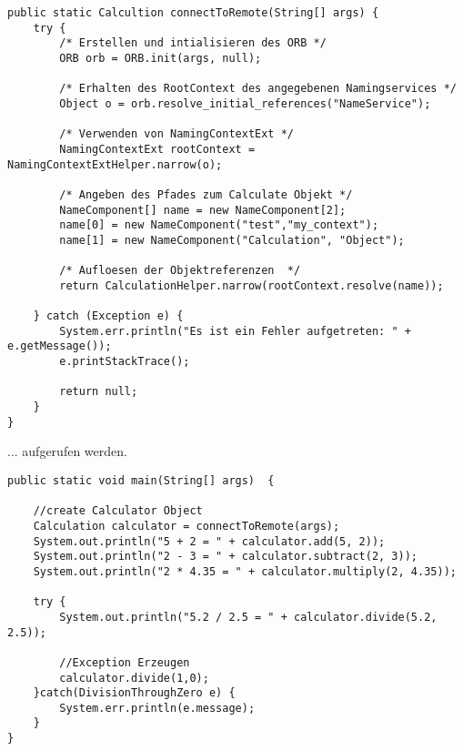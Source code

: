 \begin{lstlisting}[style=java, caption=Client.java JacORB Verbindung]
public static Calcultion connectToRemote(String[] args) {
	try {
		/* Erstellen und intialisieren des ORB */
		ORB orb = ORB.init(args, null);

		/* Erhalten des RootContext des angegebenen Namingservices */
		Object o = orb.resolve_initial_references("NameService");

		/* Verwenden von NamingContextExt */
		NamingContextExt rootContext = NamingContextExtHelper.narrow(o);

		/* Angeben des Pfades zum Calculate Objekt */
		NameComponent[] name = new NameComponent[2];
		name[0] = new NameComponent("test","my_context");
		name[1] = new NameComponent("Calculation", "Object");

		/* Aufloesen der Objektreferenzen  */
		return CalculationHelper.narrow(rootContext.resolve(name));

	} catch (Exception e) {
		System.err.println("Es ist ein Fehler aufgetreten: " + e.getMessage());
		e.printStackTrace();

		return null;
	}
}

\end{lstlisting}

... aufgerufen werden.

\begin{lstlisting}[style=java, caption=Client.java JacORB Verbindung]
public static void main(String[] args)  {

	//create Calculator Object
	Calculation calculator = connectToRemote(args);
	System.out.println("5 + 2 = " + calculator.add(5, 2));
	System.out.println("2 - 3 = " + calculator.subtract(2, 3));
	System.out.println("2 * 4.35 = " + calculator.multiply(2, 4.35));

	try {
		System.out.println("5.2 / 2.5 = " + calculator.divide(5.2, 2.5));

		//Exception Erzeugen
		calculator.divide(1,0);
	}catch(DivisionThroughZero e) {
		System.err.println(e.message);
	}
}
\end{lstlisting}

